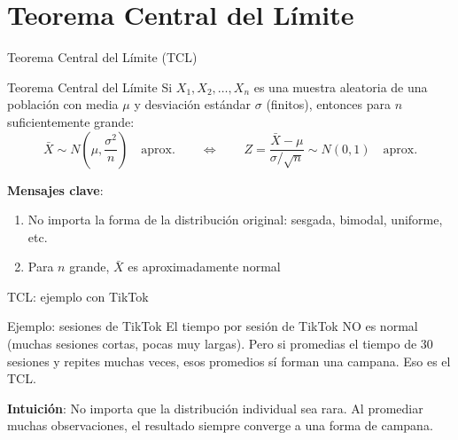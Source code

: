 \documentclass[aspectratio=169, 11pt]{beamer}
\begin{document}
\section{Teorema Central del Límite}

\begin{frame}{Teorema Central del L\'imite (TCL)}
\begin{block}{Teorema Central del L\'imite}
Si $X_1, X_2, \ldots, X_n$ es una muestra aleatoria de una poblaci\'on con media $\mu$ y desviaci\'on est\'andar $\sigma$ (finitos), entonces para $n$ suficientemente grande:
\[
\bar{X} \sim N\!\left(\mu, \frac{\sigma^2}{n}\right) \quad \text{aprox.} \qquad \Longleftrightarrow \qquad Z = \frac{\bar{X} - \mu}{\sigma/\sqrt{n}} \sim N(0, 1) \quad \text{aprox.}
\]
\end{block}

\vspace{0.3em}
\textbf{Mensajes clave}:
\begin{enumerate}
\item \alert{No importa la forma de la distribuci\'on original}: sesgada, bimodal, uniforme, etc.
\item \alert{Para $n$ grande, $\bar{X}$ es aproximadamente normal}
\end{enumerate}
\end{frame}

\begin{frame}{TCL: ejemplo con TikTok}
\begin{exampleblock}{Ejemplo: sesiones de TikTok}
El tiempo por sesi\'on de TikTok NO es normal (muchas sesiones cortas, pocas muy largas). Pero si promedias el tiempo de 30 sesiones y repites muchas veces, esos promedios s\'i forman una campana. Eso es el TCL.
\end{exampleblock}

\vspace{0.5em}
\textbf{Intuici\'on}: No importa que la distribuci\'on individual sea rara. Al promediar muchas observaciones, el resultado siempre converge a una forma de campana.
\end{frame}
\end{document}
